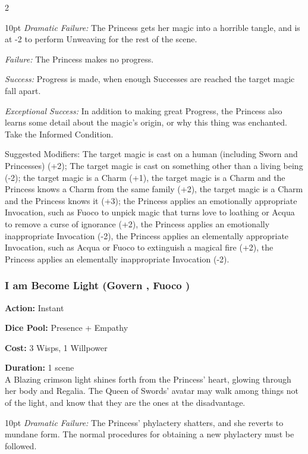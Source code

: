 \begin{multicols}{2}
\begin{myindentpar}{10pt}    \emph{Dramatic Failure:} The Princess gets her magic into a horrible tangle, and is at -2 to perform Unweaving for the rest of the scene.

    \emph{Failure:} The Princess makes no progress.
    
    \emph{Success:} Progress is made, when enough Successes are reached the target magic fall apart.
    
    \emph{Exceptional Success:} In addition to making great Progress, the Princess also learns some detail about the magic's origin, or why this thing was enchanted. Take the Informed Condition.
    
    Suggested Modifiers: The target magic is cast on a human (including Sworn and Princesses) (+2); The target magic is cast on something other than a living being (-2); the target magic is a Charm (+1), the target magic is a Charm and the Princess knows a Charm from the same family (+2), the target magic is a Charm and the Princess knows it (+3); the Princess applies an emotionally appropriate Invocation, such as Fuoco to unpick magic that turns love to loathing or Acqua to remove a curse of ignorance (+2), the Princess applies an emotionally inappropriate Invocation (-2), the Princess applies an elementally appropriate Invocation, such as Acqua or Fuoco to extinguish a magical fire (+2), the Princess applies an elementally inappropriate Invocation (-2).\end{myindentpar}

\subsubsection*{I am Become Light (Govern \textbullet\textbullet\textbullet\textbullet\textbullet, Fuoco \textbullet\textbullet\textbullet\textbullet)}

\noindent \textbf{Action:} Instant 

\noindent \textbf{Dice Pool:} Presence + Empathy

\noindent \textbf{Cost:} 3 Wisps, 1 Willpower

\noindent \textbf{Duration:} 1 scene \\

\noindent A Blazing crimson light shines forth from the Princess' heart, glowing through her body and Regalia. The Queen of Swords' avatar may walk among things not of the light, and know that they are the ones at the disadvantage.

   \begin{myindentpar}{10pt} \emph{Dramatic Failure:} The Princess' phylactery shatters, and she reverts to mundane form. The normal procedures for obtaining a new phylactery must be followed.


\end{myindentpar}
\end{multicols}
